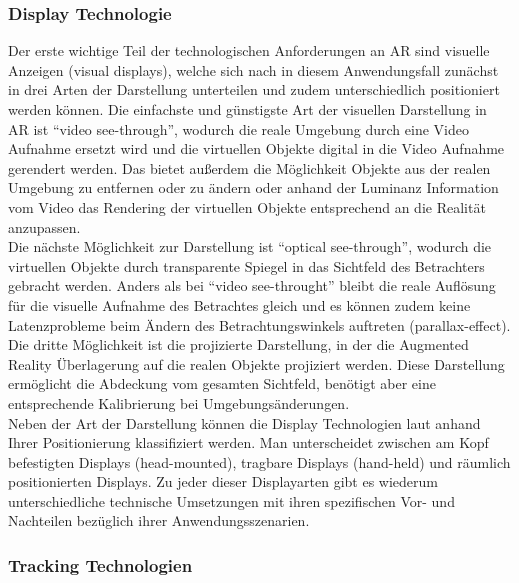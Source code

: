 \subsubsection{Display Technologie}

Der erste wichtige Teil der technologischen Anforderungen an AR sind visuelle Anzeigen (visual displays), welche sich nach \citet{van2010survey}
in diesem Anwendungsfall zunächst in drei Arten der Darstellung unterteilen und zudem unterschiedlich positioniert werden können. Die einfachste und günstigste Art der visuellen Darstellung in AR ist \enquote{video see-through}, wodurch die reale Umgebung durch eine Video Aufnahme ersetzt wird und die virtuellen Objekte digital in die Video Aufnahme gerendert werden. Das bietet außerdem die Möglichkeit Objekte aus der realen Umgebung zu entfernen oder zu ändern oder anhand der Luminanz Information vom Video das Rendering der virtuellen Objekte entsprechend an die Realität anzupassen.\\

Die nächste Möglichkeit zur Darstellung ist \enquote{optical see-through}, wodurch die virtuellen Objekte durch transparente Spiegel in das Sichtfeld des Betrachters gebracht werden. Anders als bei \enquote{video see-throught} bleibt die reale Auflösung für die visuelle Aufnahme des Betrachtes gleich und es können zudem keine Latenzprobleme beim Ändern des Betrachtungswinkels auftreten (parallax-effect).\\

Die dritte Möglichkeit ist die projizierte Darstellung, in der die Augmented Reality Überlagerung auf die realen Objekte projiziert werden. Diese Darstellung ermöglicht die Abdeckung vom gesamten Sichtfeld, benötigt aber eine entsprechende Kalibrierung bei Umgebungsänderungen.\\

Neben der Art der Darstellung können die Display Technologien laut \citet{azuma2001recent} anhand Ihrer Positionierung klassifiziert werden. Man unterscheidet zwischen am Kopf befestigten Displays (head-mounted), tragbare Displays (hand-held) und räumlich positionierten Displays. Zu jeder dieser Displayarten gibt es wiederum unterschiedliche technische Umsetzungen mit ihren spezifischen Vor- und Nachteilen bezüglich ihrer Anwendungsszenarien.\\

\subsubsection{Tracking Technologien}

